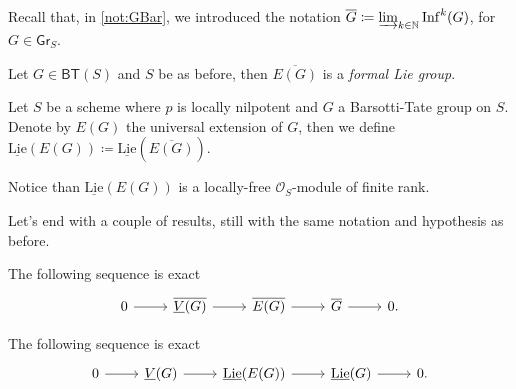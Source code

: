 \documentclass[../Main]{subfiles}
\begin{document}
\noindent
Recall that, in \cref{not:GBar}, we introduced the notation
$\overline{G} \coloneqq \varinjlim_{k \in \mathbb{N}} \mathrm{Inf}^k(G)$,
for $G \in \mathsf{Gr}_S$.
\begin{prop}
	Let $G \in \mathsf{BT}(S)$ and $S$ be as before,
	then $\overline{E(G)}$ is a {\em formal Lie group}.
\end{prop} 


\begin{defn}[]
	Let $S$ be a scheme where $p$ is locally nilpotent and $G$
	a Barsotti-Tate group on $S$.
	Denote by $E(G)$ the universal extension of $G$, then we define
	$\underline{\mathrm{Lie}}(E(G)) \coloneqq \underline{\mathrm{Lie}}(\overline{E(G)})$.
\end{defn}


\begin{rem}[]
	Notice than $\underline{\mathrm{Lie}}(E(G))$ is a locally-free
	$\mathcal{O}_{ S }$-module of finite rank.
\end{rem}


\noindent
Let's end with a couple of results, still with the same notation and hypothesis as before.
\begin{prop}
	The following sequence is exact
	\begin{equation*}
	\begin{tikzcd}
		0 \arrow[r, "", rightarrow] &
		\overline{\underline{V}(G)} \arrow[r, "", rightarrow] &
		\overline{E(G)} \arrow[r, "", rightarrow] &
		\overline{G} \arrow[r, "", rightarrow] &
		0
	.\end{tikzcd}
	\end{equation*}
\end{prop} 


\begin{prop}
	The following sequence is exact
	\begin{equation*}
	\begin{tikzcd}
		0 \arrow[r, "", rightarrow] &
		\underline{V}(G) \arrow[r, "", rightarrow] &
		\underline{\mathrm{Lie}}(E(G)) \arrow[r, "", rightarrow] &
		\underline{\mathrm{Lie}}(G) \arrow[r, "", rightarrow] &
		0
	.\end{tikzcd}
	\end{equation*}
\end{prop} 
\end{document}
